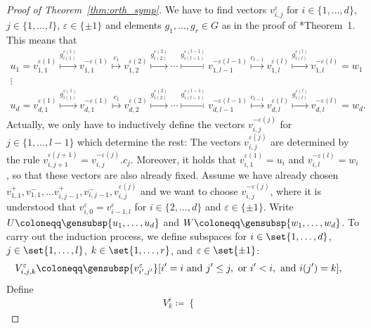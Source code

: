 \documentclass[a4paper,12pt]{amsproc}
\theoremstyle{plain}
\theoremstyle{definition}
\begin{document}
\begin{proof}[Proof of Theorem~\ref{thm:orth_symp}]
We have to find vectors $v_{i,j}^{\varepsilon}$ for $i\in\{1,\ldots,d\}$, $j\in\{1,\ldots,l\}$, $\varepsilon\in\{\pm1\}$ and elements $g_1,\ldots,g_r\in G$ as in the proof of \cite{bradfordschneiderthom2023non}*{Theorem~1}. This means that
\begin{gather*}
u_1=v_{1,1}^{\varepsilon(1)}\stackrel{g^{\varepsilon(1)}_{i(1)}}{\mapsto}
v_{1,1}^{-\varepsilon(1)}\stackrel{c_1}{\mapsto} v_{1,2}^{\varepsilon(2)}\stackrel{g^{\varepsilon(2)}_{i(2)}}{\mapsto}\cdots\stackrel{g^{\varepsilon(l-1)}_{i(l-1)}}{\mapsto}v_{1,l-1}^{-\varepsilon(l-1)}\stackrel{c_{l-1}}{\mapsto}v_{1,l}^{\varepsilon(l)}\stackrel{g^{\varepsilon(l)}_{i(l)}}{\mapsto}v_{1,l}^{-\varepsilon(l)}=w_1\\
\vdots\\
u_d=v_{d,1}^{\varepsilon(1)}\stackrel{g^{\varepsilon(1)}_{i(1)}}{\mapsto}v_{d,1}^{-\varepsilon(1)}\stackrel{c_1}{\mapsto} v_{d,2}^{\varepsilon(2)}\stackrel{g^{\varepsilon(2)}_{i(2)}}{\mapsto}\cdots\stackrel{g^{\varepsilon(l-1)}_{i(l-1)}}{\mapsto}v_{d,l-1}^{-\varepsilon(l-1)}\stackrel{c_{l-1}}{\mapsto}v_{d,l}^{\varepsilon(l)}\stackrel{g^{\varepsilon(l)}_{i(l)}}{\mapsto}v_{d,l}^{-\varepsilon(l)}=w_d.
\end{gather*}
Actually, we only have to inductively define the vectors $v_{i,j}^{-\varepsilon(j)}$ for $j\in\{1,\ldots,l-1\}$ which determine the rest: The vectors $v_{i,j}^{\varepsilon(j)}$ are determined by the rule $v_{i,j+1}^{\varepsilon(j+1)}=v_{i,j}^{-\varepsilon(j)}.c_j$. Moreover, it holds that $v_{i,1}^{\varepsilon(1)}=u_i$ and $v_{i,l}^{-\varepsilon(l)}=w_i$, so that these vectors are also already fixed. Assume we have already chosen $v_{1,1}^+,v_{1,1}^-,\ldots v_{i,j-1}^+,v_{i,j-1}^-,v_{i,j}^{\varepsilon(j)}$ and we want to choose $v_{i,j}^{-\varepsilon(j)}$, where it is understood that $v_{i,0}^\varepsilon=v_{i-1,l}^\varepsilon$ for $i\in\{2,\ldots,d\}$ and $\varepsilon\in\{\pm1\}$. Write $U\coloneqq\gensubsp{u_1,\ldots,u_d}$ and $W\coloneqq\gensubsp{w_1,\ldots,w_d}$. To carry out the induction process, we define subspaces for $i\in\set{1,\ldots,d}$, $j\in\set{1,\ldots,l}$, $k\in\set{1,\ldots,r}$, and $\varepsilon\in\set{\pm1}$:
\begin{align*}
V_{i,j,k}^\varepsilon &\coloneqq\gensubsp{v_{i',j'}^\varepsilon}[i'=i\text{ and }j'\leq j, \text{ or }i'<i,\text{ and }i(j')=k],
\end{align*}
Define
\begin{align*}
V_k^\varepsilon\coloneqq\begin{cases} 

\end{cases}
\end{align*}
\end{proof}
\end{document}
